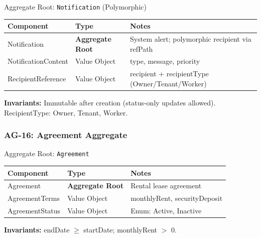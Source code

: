 \documentclass[12pt,a4paper]{article}
\begin{document}
\begin{infobox}{Aggregate Root: \texttt{Notification} (Polymorphic)}
\begin{tabular}{@{}p{3cm}p{2.8cm}p{7.8cm}@{}}
\textbf{Component} & \textbf{Type} & \textbf{Notes} \\
\hline
Notification & \textbf{Aggregate Root} & System alert; polymorphic recipient via refPath \\
NotificationContent & Value Object & type, message, priority \\
RecipientReference & Value Object & recipient + recipientType (Owner/Tenant/Worker) \\
\end{tabular}

\textbf{Invariants:} Immutable after creation (status-only updates allowed). RecipientType: Owner, Tenant, Worker.
\end{infobox}

\subsubsection{AG-16: Agreement Aggregate}

\begin{infobox}{Aggregate Root: \texttt{Agreement}}
\begin{tabular}{@{}p{3cm}p{2.8cm}p{7.8cm}@{}}
\textbf{Component} & \textbf{Type} & \textbf{Notes} \\
\hline
Agreement & \textbf{Aggregate Root} & Rental lease agreement \\
AgreementTerms & Value Object & monthlyRent, securityDeposit \\
AgreementStatus & Value Object & Enum: Active, Inactive \\
\end{tabular}

\textbf{Invariants:} endDate $\geq$ startDate; monthlyRent $>$ 0.
\end{infobox}

\vspace{1em}
\end{document}

